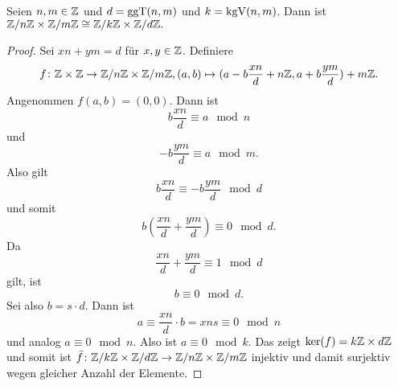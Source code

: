 \begin{Lemma}\label{Lem:ChinRest1}
    Seien $n,m\in\mathbb{Z}$ und $d=\operatorname{ggT}(n,m)$ und $k=\operatorname{kgV}(n,m)$.
    Dann ist $\mathbb{Z}/n\mathbb{Z}\times\mathbb{Z}/m\mathbb{Z}\cong \mathbb{Z}/k\mathbb{Z}\times\mathbb{Z}/d\mathbb{Z}.$
\end{Lemma}
\begin{proof}
    Sei $xn+ym=d$ für $x,y\in \mathbb{Z}$.
    Definiere $$f\colon \mathbb{Z}\times \mathbb{Z}\to\mathbb{Z}/n\mathbb{Z}\times\mathbb{Z}/m\mathbb{Z}, (a,b)\mapsto (a-b\frac{xn}{d}+n\mathbb{Z},a+b\frac{ym}{d})+m\mathbb{Z}.$$
    Angenommen $f(a,b)=(0,0)$. Dann ist $$b\frac{xn}{d}\equiv a \mod n$$ und $$-b\frac{ym}{d}\equiv a\mod m.$$ Also gilt $$b\frac{xn}{d}\equiv -b\frac{ym}{d} \mod d$$ und somit $$b(\frac{xn}{d}+\frac{ym}{d})\equiv 0 \mod d.$$ Da $$\frac{xn}{d}+\frac{ym}{d}\equiv 1\mod d$$ gilt, ist $$b\equiv 0 \mod d.$$ Sei also $b=s\cdot d$. Dann ist $$a\equiv \frac{xn}{d}\cdot b=xns\equiv 0\mod n$$ und analog $a\equiv 0 \mod n$. Also ist $a\equiv 0\mod k$. Das zeigt $\ker(f)=k\mathbb{Z}\times d\mathbb{Z}$ und somit ist $\bar f\colon \mathbb{Z}/k\mathbb{Z}\times \mathbb{Z}/d\mathbb{Z}\to \mathbb{Z}/n\mathbb{Z}\times \mathbb{Z}/m\mathbb{Z}$ injektiv und damit surjektiv wegen gleicher Anzahl der Elemente.
\end{proof}

